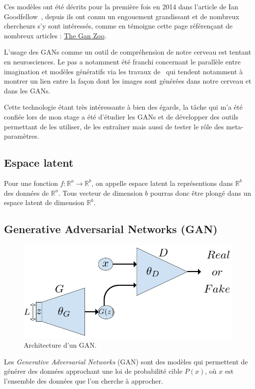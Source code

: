 \documentclass[11pt,francais]{article}
\begin{document}
Ces modèles ont été décrits pour la première fois en 2014 dans l'article de Ian Goodfellow~\cite{NIPS2014_5423}, depuis ils ont connu un engouement grandissant et de nombreux chercheurs s'y sont intéressés, comme en témoigne cette page référençant de nombreux articles : \href{https://github.com/hindupuravinash/the-gan-zoo}{The Gan Zoo}. %

L'usage des GANs comme un outil de compréhension de notre cerveau est tentant en neurosciences. Le pas a notamment été franchi concernant le parallèle entre imagination et modèles génératifs via les travaux de~\cite{GAN_Brain_Signals} qui tendent notamment à montrer un lien entre la façon dont les images sont générées dans notre cerveau et dans les GANs.

Cette technologie étant très intéressante à bien des égards, la tâche qui m'a été confiée lors de mon stage a été d'étudier les GANs et de développer des outils permettant de les utiliser, de les entraîner mais aussi de tester le rôle des meta-paramètres.

\subsection{Espace latent}
Pour une fonction \(f : \mathbb{R}^a \rightarrow \mathbb{R}^b \), on appelle espace latent la représentions dans \(\mathbb{R}^b\) des données de \(\mathbb{R}^a\).
Tous vecteur de dimension \(b\) pourras donc être plongé dans un espace latent de dimension \(\mathbb{R}^b\).

\subsection{Generative Adversarial Networks (GAN)}
\label{sec:GAN}
\begin{figure}[!h]
    \centering
    \includegraphics[width=\textwidth]{Figures/GAN/GAN_representation.png}
    \caption{Architecture d'un GAN.}
    \label{fig:fig9}
\end{figure}
Les \textit{Generative Adversarial Networks} (GAN) sont des modèles qui permettent de générer des données approchant une loi de probabilité cible \(P(x)\), où \(x\) est l'ensemble des données que l'on cherche à approcher.
\end{document}
